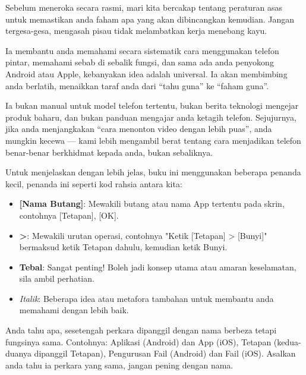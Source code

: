 
Sebelum meneroka secara rasmi, mari kita bercakap tentang peraturan asas untuk memastikan anda faham apa yang akan dibincangkan kemudian. Jangan tergesa-gesa, mengasah pisau tidak melambatkan kerja menebang kayu.


Ia membantu anda memahami secara sistematik cara menggunakan telefon pintar, memahami sebab di sebalik fungsi, dan sama ada anda penyokong Android atau Apple, kebanyakan idea adalah universal. Ia akan membimbing anda berlatih, menaikkan taraf anda dari “tahu guna” ke “faham guna”.

Ia bukan manual untuk model telefon tertentu, bukan berita teknologi mengejar produk baharu, dan bukan panduan mengajar anda ketagih telefon. Sejujurnya, jika anda menjangkakan “cara menonton video dengan lebih puas”, anda mungkin kecewa — kami lebih mengambil berat tentang cara menjadikan telefon benar-benar berkhidmat kepada anda, bukan sebaliknya.


Untuk menjelaskan dengan lebih jelas, buku ini menggunakan beberapa penanda kecil, penanda ini seperti kod rahsia antara kita:

\begin{itemize}
  \item \textbf{[Nama Butang]}: Mewakili butang atau nama App tertentu pada skrin, contohnya [Tetapan], [OK].
  \item \textbf{>}: Mewakili urutan operasi, contohnya "Ketik [Tetapan] > [Bunyi]" bermaksud ketik Tetapan dahulu, kemudian ketik Bunyi.
  \item \textbf{Tebal}: Sangat penting! Boleh jadi konsep utama atau amaran keselamatan, sila ambil perhatian.
  \item \emph{Italik}: Beberapa idea atau metafora tambahan untuk membantu anda memahami dengan lebih baik.
\end{itemize}


Anda tahu apa, sesetengah perkara dipanggil dengan nama berbeza tetapi fungsinya sama. Contohnya: Aplikasi (Android) dan App (iOS), Tetapan (kedua-duanya dipanggil Tetapan), Pengurusan Fail (Android) dan Fail (iOS). Asalkan anda tahu ia perkara yang sama, jangan pening dengan nama.

